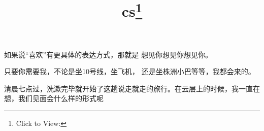 \documentclass{article}
\title{cs\footnote{Click to View:\url{}}}
\author{}
\date{}
\begin{document}

\maketitle


\Large

如果说“喜欢”有更具体的表达方式，那就是
想见你想见你想见你。 

只要你需要我，不论是坐10号线，坐飞机，
还是坐株洲小巴等等，我都会来的。 

清晨七点过，洗漱完毕就开始了这趟说走就走的旅行。在云层上的时候，我一直在想，我们见面会什么样的形式呢
\end{document}
